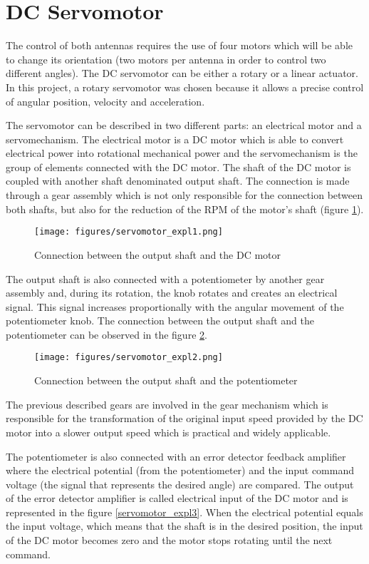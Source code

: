 \section{DC Servomotor}\label{sec:servo_motor}

The control of both antennas requires the use of four motors which will be able to change its orientation (two motors per antenna in order to control two different angles). The DC servomotor can be either a rotary or a linear actuator. In this project, a rotary servomotor was chosen because it allows a precise control of angular position, velocity and acceleration.

The servomotor can be described in two different parts: an electrical motor and a servomechanism. The electrical motor is a DC motor which is able to convert electrical power into rotational mechanical power and the servomechanism is the group of elements connected with the DC motor. The shaft of the DC motor is coupled with another shaft denominated output shaft. The connection is made through a gear assembly which is not only responsible for the connection between both shafts, but also for the reduction of the RPM of the motor’s shaft (figure \ref{servomotor_expl1}).

\begin{figure}[H]
\centering
\texttt{[image: figures/servomotor\_expl1.png]}
\caption{Connection between the output shaft and the DC motor}
\label{servomotor_expl1}
\end{figure}

The output shaft is also connected with a potentiometer by another gear assembly and, during its rotation, the knob rotates and creates an electrical signal. This signal increases proportionally with the angular movement of the potentiometer knob. The connection between the output shaft and the potentiometer can be
observed in the figure \ref{servomotor_expl2}.

\begin{figure}[H]
\centering
\texttt{[image: figures/servomotor\_expl2.png]}
\caption{Connection between the output shaft and the potentiometer}
\label{servomotor_expl2}
\end{figure}

The previous described gears are involved in the gear mechanism which is responsible for the transformation of the original input speed provided by the DC motor into a slower output speed which is practical and widely applicable. 

The potentiometer is also connected with an error detector feedback amplifier where the electrical potential (from the potentiometer) and the input command voltage (the signal that represents the desired angle) are compared. The output of the error detector amplifier is called electrical input of the DC motor and is represented in the figure \ref{servomotor_expl3}. When the electrical potential equals the input voltage, which means that the shaft is in the desired position, the input of the DC motor becomes zero and the motor stops rotating until the next command.

